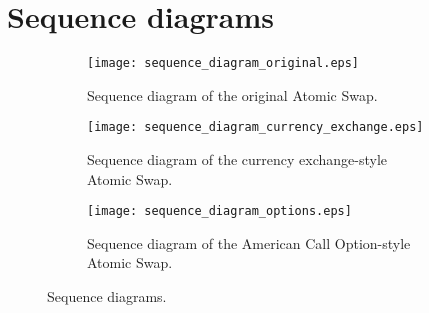\newpage

\appendix

\section{Sequence diagrams}

\begin{figure*}[t]
\centering
    \begin{subfigure}{.3\textwidth}
        \texttt{[image: sequence\_diagram\_original.eps]}
        \caption{Sequence diagram of the original Atomic Swap.}
        \label{fig:sequence_diagram_original}
    \end{subfigure}
    \quad
    \begin{subfigure}{.3\textwidth}
        \texttt{[image: sequence\_diagram\_currency\_exchange.eps]}
        \caption{Sequence diagram of the currency exchange-style Atomic Swap.}
        \label{fig:sequence_diagram_currency_exchange}
    \end{subfigure}
    \quad
    \begin{subfigure}{.3\textwidth}
        \texttt{[image: sequence\_diagram\_options.eps]}
        \caption{Sequence diagram of the American Call Option-style Atomic Swap.}
        \label{fig:sequence_diagram_options}
    \end{subfigure}
\caption{Sequence diagrams.}
\label{fig:sequence_diagrams}
\end{figure*}